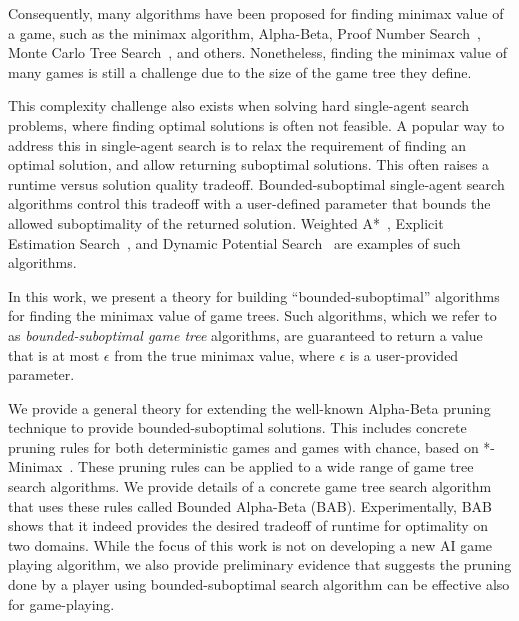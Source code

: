 \documentclass[runningheads]{llncs}
\begin{document}
Consequently, many algorithms have been proposed for finding minimax value of a game, such as the minimax algorithm, Alpha-Beta, Proof Number Search~\citep{allis1994proof}, Monte Carlo Tree Search~\citep{coulom2006efficient,kocsis2006bandit,lanctot2013monte}, and others. 
Nonetheless, finding the minimax value of many games is still a challenge due to the size of the game tree they define. 

This complexity challenge also exists when solving hard single-agent search problems, where finding optimal solutions is often not feasible. A popular way to address this in single-agent search is to relax the requirement of finding an optimal solution, and allow returning suboptimal solutions. This often raises a runtime versus solution quality tradeoff. Bounded-suboptimal single-agent search algorithms control this tradeoff with a user-defined parameter that bounds the allowed suboptimality of the returned solution. Weighted A*~\citep{pohl1970heuristic}, Explicit Estimation Search~\citep{thayer2011bounded}, and Dynamic Potential Search~\citep{gilon2016dynamic} are examples of such algorithms. 

In this work, we present a theory for building ``bounded-suboptimal'' algorithms for finding the minimax value of game trees. Such algorithms, which we refer to as \emph{bounded-suboptimal game tree} algorithms, are guaranteed to return a value that is at most $\epsilon$ from the true minimax value, where $\epsilon$ is a user-provided parameter. 


We provide a general theory for extending the well-known Alpha-Beta pruning technique to provide bounded-suboptimal solutions. This includes concrete pruning rules for both deterministic games and games with chance, based on *-Minimax~\citep{ballard1983minimax,hauk2004rediscovering}. These pruning rules can be applied to a wide range of game tree search algorithms. We provide details of a concrete game tree search algorithm that uses these rules called Bounded Alpha-Beta (BAB). Experimentally, BAB shows that it indeed provides the desired tradeoff of runtime for optimality on two domains. 
While the focus of this work is not on developing a new AI game playing algorithm, we also provide preliminary evidence that suggests the pruning done by a player using bounded-suboptimal search algorithm can be effective also for game-playing. 

\end{document}
